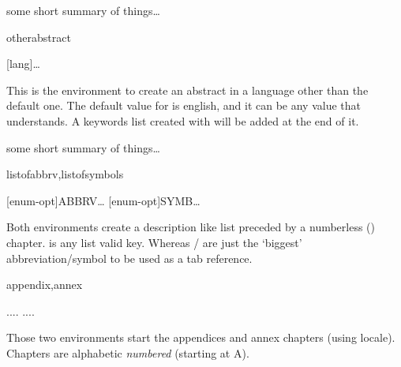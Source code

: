 \documentclass[article,nogeometry,english,tocdepth=3,secdepth=3]{ufrgscca} %
\begin{document}
\begin{codestore}[st=d.abstract]
	\begin{mainabstract} some short summary of things\ldots
	\end{mainabstract}
\end{codestore}

\begin{codedescribe}[env,update=2023/11/18]{otherabstract}
	\begin{codesyntax}%
		\tsmacro{\begin{otherabstract}}[lang]\ldots\tsmacro{\end{otherabstract}}{}
	\end{codesyntax}
This is the environment to create an abstract in a language other than the default one.
The default value for  is english, and it can be any value that  understands. A keywords list created with \tsmacro{\otherkeyword}{} will be added at the end of it.
\end{codedescribe}

\begin{codestore}[st=d.oabstract]
	\otherkeyword{a keyword}
	\otherkeyword{another keyword}
	\begin{otherabstract}[english] some short summary of things\ldots
	\end{otherabstract}
\end{codestore}


\begin{codedescribe}[env]{listofabbrv,listofsymbols}
	\begin{codesyntax}%
	\tsmacro{\begin{listofabbrv}}[enum-opt]{ABBRV}\ldots\tsmacro{\end{listofabbrv}}{}
	\tsmacro{\begin{listofsymbols}}[enum-opt]{SYMB}\ldots\tsmacro{\end{listofsymbols}}{}
	\end{codesyntax}
\end{codedescribe}
Both environments create a description like list preceded by a numberless (\tsmacro{\nonum}{}) chapter.  is any  list valid key. Whereas  /  are just the `biggest' abbreviation/symbol to be used as a tab reference.

\begin{codedescribe}[env]{appendix,annex}
	\begin{codesyntax}%
		\tsmacro{\begin{appendix}}{}.... \tsmacro{\end{appendix}}{}
		\tsmacro{\begin{annex}}{}.... \tsmacro{\end{annex}}{}
	\end{codesyntax}
\end{codedescribe}
Those two environments start the appendices and annex chapters (using locale). Chapters are  alphabetic \emph{numbered} (starting at A).
\end{document}
